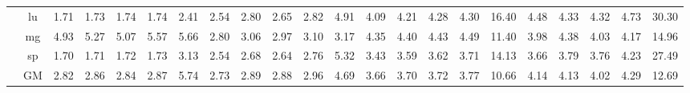 \begin{table*}[]
\begin{center}
{\begin{tabular}{|c|c|rrrrr|rrrrr|rrrrr|rrrrr|}
 &  lu  &  1.71  &  1.73  &  1.74  &  1.74  &   2.41  &  2.54  &  2.80  & \cellcolor{blue!25} 2.65  &  2.82  &  4.91  &  4.09  &  4.21  &  4.28  &  4.30  &  16.40  &  4.48  & \cellcolor{blue!25} 4.33  & \cellcolor{blue!25} 4.32  &  4.73  &  30.30 \\
 &  mg  &  4.93  &  5.27  & \cellcolor{blue!25} 5.07  &  5.57  &   5.66  &  2.80  &  3.06  & \cellcolor{blue!25} 2.97  &  3.10  &  3.17  &  4.35  &  4.40  &  4.43  &  4.49  &  11.40  &  3.98  &  4.38  & \cellcolor{blue!25} 4.03  &  4.17  &  14.96 \\
 &  sp  &  1.70  &  1.71  &  1.72  &  1.73  &   3.13  &  2.54  &  2.68  & \cellcolor{blue!25} 2.64  &  2.76  &  5.32  &  3.43  &  3.59  &  3.62  &  3.71  &  14.13  &  3.66  &  3.79  & \cellcolor{blue!25} 3.76  &  4.23  &  27.49 \\ \cline{2-22}
 &  GM  &  2.82  &  2.86  & \cellcolor{blue!25} 2.84  &  2.87  &   5.74  &  2.73  &  2.89  & \cellcolor{blue!25} 2.88  &  2.96  &  4.69  &  3.66  &  3.70  &  3.72  &  3.77  &  10.66  &  4.14  & \cellcolor{blue!25} 4.13  & \cellcolor{blue!25} 4.02  &  4.29  &  12.69 \\
\hline 
\end{tabular} }

\end{center}
\end{table*}
